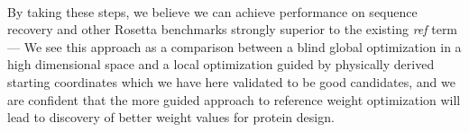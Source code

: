 \paragraph{}
By taking these steps, we believe we can achieve performance on sequence recovery and other Rosetta benchmarks strongly superior to the existing \textit{ref} term---
We see this approach as a comparison between a blind global optimization in a high dimensional space and a local optimization guided by physically derived starting coordinates which we have here validated to be good candidates, and we are confident that the more guided approach to reference weight optimization will lead to discovery of better weight values for protein design.
